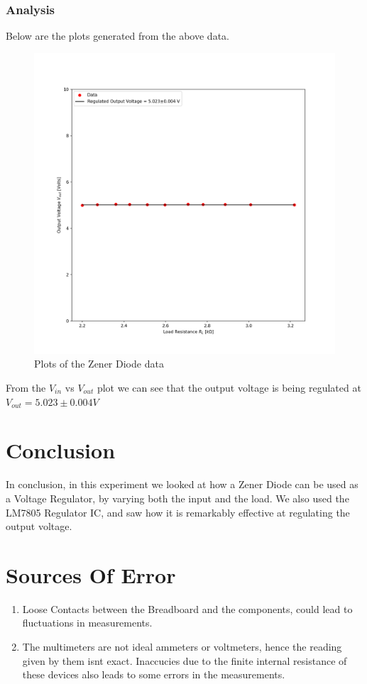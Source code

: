 \documentclass[10pt]{scrartcl}
\theoremstyle{definition}
\begin{document}
\subsubsection{Analysis}
Below are the plots generated from the above data.

\begin{figure}[!h]
    \centering
    \includegraphics[width=0.5\linewidth]{loadreg-ic.png}
    \caption{Plots of the Zener Diode data}
\end{figure}
From the $V_{in}$ vs $V_{out}$ plot we can see that the output voltage is being 
regulated at $\boxed{V_{out} = 5.023 \pm 0.004 V}$
\clearpage
\section{Conclusion}
In conclusion, in this experiment we looked at how a Zener Diode can be used as a Voltage Regulator, by varying both
the input and the load. We also used the LM7805 Regulator IC, and saw how it is remarkably effective at regulating the output
voltage.
\section{Sources Of Error}
\begin{enumerate}
    \item Loose Contacts between the Breadboard and the components, could lead to fluctuations in measurements.
    \item The multimeters are not ideal ammeters or voltmeters, hence the reading given by them isnt exact. Inaccucies due to
        the finite internal resistance of these devices also leads to some errors in the measurements.
    
\end{enumerate}
\end{document}
